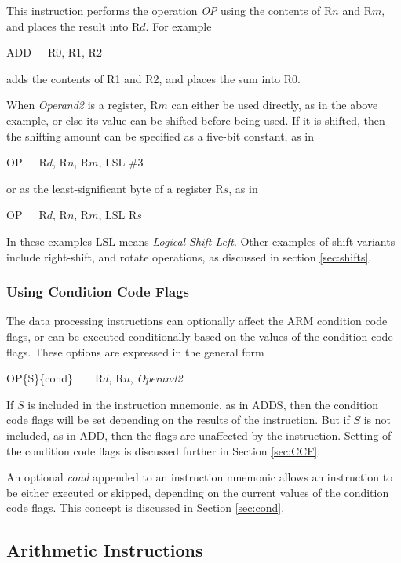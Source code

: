 \documentclass[11pt, twoside, pdftex]{article}
\begin{document}
\noindent
This instruction performs the operation {\it OP} using the contents of R$n$ and R$m$, and
places the result into R$d$. For example
\begin{center}
ADD~~~R0, R1, R2
\end{center}
\noindent
adds the contents of R1 and R2, and places the sum into R0.

\noindent
When {\it Operand2} is a register, R$m$ can either be used directly, as in the 
above example, or else its value can be shifted before being used. 
If it is shifted, then the shifting amount can be specified as a 
five-bit constant, as in
\begin{center}
OP~~~R$d$, R$n$, R$m$, LSL \#3
\end{center}

\noindent
or as the least-significant byte of a register R$s$, as in
\noindent
\begin{center}
OP~~~R$d$, R$n$, R$m$, LSL R$s$
\end{center}
\noindent
In these examples LSL means {\it Logical Shift Left}. Other examples
of shift variants include right-shift, and rotate operations, as 
discussed in section \ref{sec:shifts}.

\subsubsection{Using Condition Code Flags}
\label{sec:conditions}
The data processing instructions can optionally affect the ARM condition code flags, or
can be executed conditionally based on the values of the condition code flags. These
options are expressed in the general form
\begin{center}
OP\{S\}\{cond\}~~~~R$d$, R$n$, {\it Operand2}
\end{center}
\noindent
If $S$ is included in the instruction mnemonic, as in ADDS, then the condition code flags
will be set depending on the results of the instruction. But if $S$ is not included, as in ADD,
then the flags are unaffected by the instruction. Setting of the condition code flags is
discussed further in Section \ref{sec:CCF}.

\noindent
An optional {\it cond} appended to an instruction mnemonic allows an instruction 
to be either executed or skipped, depending on the current values of the condition code flags. This 
concept is discussed in Section \ref{sec:cond}.

\noindent
\subsection{Arithmetic Instructions}
\label{sec:arith}
\end{document}
